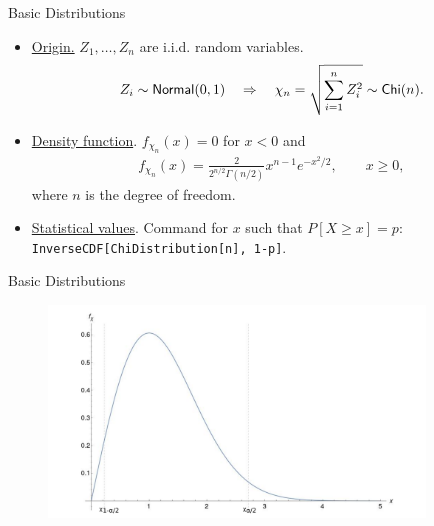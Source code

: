 \begin{frame}{Basic Distributions}

\begin{itemize}
	\item \underline{Origin.} $Z_1, \ldots, Z_n$ are i.i.d. random variables.
	\begin{align*}
	Z_i\sim \mathsf{Normal}(0, 1) \quad \Rightarrow\quad \chi_n = \sqrt{\sum_{i=1}^n Z_i^2} \sim \mathsf{Chi}(n).
	\end{align*}
	\item \underline{Density function}. $f_{\chi_n}(x) = 0$ for $x < 0$ and
	\begin{align*}
	f_{\chi_n}(x) = \frac{2}{2^{n/2}\Gamma(n/2)} x^{n-1} e^{-x^2/2}, \qquad x \geq 0,
	\end{align*}
	where $n$ is the degree of freedom.
	\item \underline{Statistical values}. Command for $x$ such that $P[X\geq x] = p$:\\
	\texttt{InverseCDF[ChiDistribution[n], 1-p]}.
\end{itemize}

\end{frame}

\begin{frame}{Basic Distributions}

\begin{figure}[htbp]
\centering
\includegraphics[width=10cm]{./images/rc4fig13.pdf}
\end{figure}

\end{frame}


